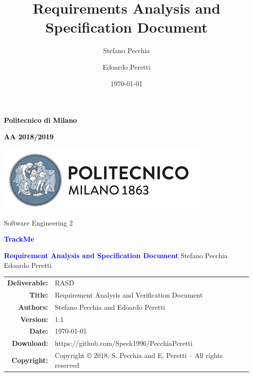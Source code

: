 \documentclass[a4paper,11pt]{report}
\title{Requirements Analysis and Specification Document}
\author{Stefano Pecchia \and Edoardo Peretti}
\date{\today}
\begin{document}
\begin{titlepage}
\centering

\textcolor{black}{\textbf{Politecnico di Milano}} \par
\textcolor{black}{\textbf{AA 2018/2019}} \par  \vspace{2em}
\includegraphics[scale=0.7]{resources/PolimiLogo}\par \vspace{1em}

Software Engineering 2 \par \vspace{1.5cm}
\textcolor{Blue}{\Large\textbf{TrackMe}} \par \vspace{3cm}

{\textcolor{Blue}{\textbf{\Huge{Requirement Analysis and Specification Document}}}} \vfill
Stefano Pecchia \hspace{5em} Edoardo Peretti \vspace{4cm}
\end{titlepage}



\begin{table}[h!]
\centering
\begin{tabular}{rl}
\hline
\textbf{Deliverable:} & RASD\\
\textbf{Title:} & Requirement Analysis and Verification Document \\
\textbf{Authors:} & Stefano Pecchia and Edoardo Peretti\\
\textbf{Version:} & 1.1 \\ 
\textbf{Date:} & \today \\
\textbf{Download:} & https://github.com/Speck1996/PecchiaPeretti \\
\textbf{Copyright:} & Copyright © 2018, S. Pecchia and E. Peretti – All rights reserved \\
\hline
\end{tabular}
\end{table}



\tableofcontents








\end{document}
